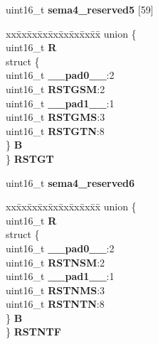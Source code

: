 \begin{DoxyCompactItemize}
\begin{tabbing}
\end{tabbing}\item 
\mbox{\label{structSEMA4__tag_a5092bd70ee265f3c277453f13449bcc8}} 
uint16\+\_\+t {\bfseries sema4\+\_\+reserved5} \mbox{[}59\mbox{]}
\item 
\mbox{\label{structSEMA4__tag_a62978f1169ffbca253279cd47267705d}} 
\begin{tabbing}
xx\=xx\=xx\=xx\=xx\=xx\=xx\=xx\=xx\=\kill
union \{\\
\>uint16\_t {\bfseries R}\\
\>struct \{\\
\>\>uint16\_t {\bfseries \_\_pad0\_\_}:2\\
\>\>uint16\_t {\bfseries RSTGSM}:2\\
\>\>uint16\_t {\bfseries \_\_pad1\_\_}:1\\
\>\>uint16\_t {\bfseries RSTGMS}:3\\
\>\>uint16\_t {\bfseries RSTGTN}:8\\
\>\} {\bfseries B}\\
\} {\bfseries RSTGT}\\

\end{tabbing}\item 
\mbox{\label{structSEMA4__tag_ac38a4edc64c531024bdc275c99090d18}} 
uint16\+\_\+t {\bfseries sema4\+\_\+reserved6}
\item 
\mbox{\label{structSEMA4__tag_a1eb181b00a32cb038317acb6fb81a1a2}} 
\begin{tabbing}
xx\=xx\=xx\=xx\=xx\=xx\=xx\=xx\=xx\=\kill
union \{\\
\>uint16\_t {\bfseries R}\\
\>struct \{\\
\>\>uint16\_t {\bfseries \_\_pad0\_\_}:2\\
\>\>uint16\_t {\bfseries RSTNSM}:2\\
\>\>uint16\_t {\bfseries \_\_pad1\_\_}:1\\
\>\>uint16\_t {\bfseries RSTNMS}:3\\
\>\>uint16\_t {\bfseries RSTNTN}:8\\
\>\} {\bfseries B}\\
\} {\bfseries RSTNTF}\\


\end{tabbing}
\end{DoxyCompactItemize}
